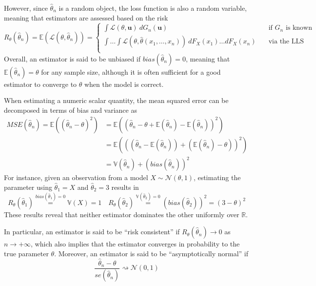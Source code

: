 \documentclass{report}
\begin{document}
However, since $\displaystyle \hat{\theta}_n$ is a random object, the loss function is also a random variable, meaning that estimators are assessed based on the risk
\[R_{\theta}(\hat{\theta}_n) = \mathbb{E}(\mathcal{L}(\theta, \hat{\theta}_n)) = \begin{cases}
    \int \mathcal{L}(\theta, \mathbf{u}) \ dG_n(\mathbf{u}) &\quad\text{if $G_n$ is known} \\
    \int\dots\int \mathcal{L}(\theta, \hat{\theta}(x_1, \dots, x_n)) \ dF_X(x_1)\dots dF_X(x_n) &\quad\text{via the LLS} \\
\end{cases}\]
Overall, an estimator is said to be unbiased if $\displaystyle bias(\hat{\theta}_n) = 0$, meaning that $\displaystyle \mathbb{E}(\hat{\theta}_n) = \theta$ for any sample size, although it is often sufficient for a good estimator to converge to $\displaystyle \theta$ when the model is correct.
\begin{examplebox}
    When estimating a numeric scalar quantity, the mean squared error can be decomposed in terms of bias and variance as
    \begin{align*}
        MSE(\hat{\theta}_n) = \mathbb{E}((\hat{\theta}_n - \theta)^2)
            &= \mathbb{E}((\hat{\theta}_n - \theta + \mathbb{E}(\hat{\theta}_n) - \mathbb{E}(\hat{\theta}_n))^2) \\
            &= \mathbb{E}(((\hat{\theta}_n - \mathbb{E}(\hat{\theta}_n)) + (\mathbb{E}(\hat{\theta}_n) - \theta))^2) \\
            &= \mathbb{V}(\hat{\theta}_n) + (bias(\hat{\theta}_n))^2
    \end{align*}
    For instance, given an observation from a model $\displaystyle X \sim \mathcal{N}(\theta, 1)$, estimating the parameter using $\displaystyle \hat{\theta}_1 = X$ and $\displaystyle \hat{\theta}_2 = 3$ results in
    \[R_{\theta}(\hat{\theta}_1) \stackrel{bias(\hat{\theta}_1) = 0}{=} \mathbb{V}(X) = 1 \quad R_{\theta}(\hat{\theta}_2) \stackrel{\mathbb{V}(\hat{\theta}_2) = 0}{=} (bias(\hat{\theta}_2))^2 = (3 - \theta)^2\]
    These results reveal that neither estimator dominates the other uniformly over $\displaystyle \mathbb{R}$.
\end{examplebox}
\noindent In particular, an estimator is said to be ``risk consistent'' if $\displaystyle R_{\theta}(\hat{\theta}_n) \to 0$ as $\displaystyle n \to +\infty$, which also implies that the estimator converges in probability to the true parameter $\displaystyle \theta$. \newline
Moreover, an estimator is said to be ``asymptotically normal'' if
\[\frac{\hat{\theta}_n - \theta}{se(\hat{\theta}_n)} \rightsquigarrow \mathcal{N}(0, 1)\]
\end{document}
